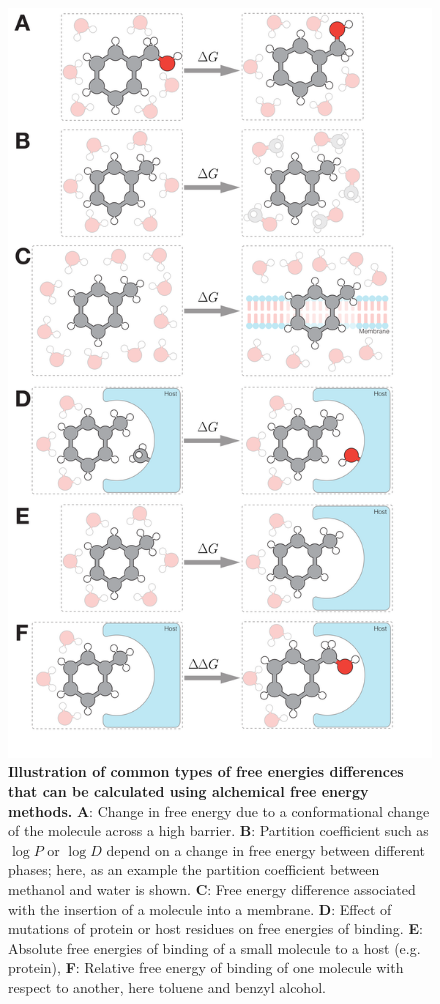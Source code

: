 \documentclass[9pt,bestpractices]{livecoms}
\begin{document}
\begin{figure}
    \includegraphics[width=0.95\linewidth]{figures/fig1_what_is_alchemy/Figure.pdf}   
    \caption{\textbf{Illustration of common types of free energies differences that can be calculated using alchemical free energy methods.} \textbf{A}: Change in free energy due to a conformational change of the molecule across a high barrier. \textbf{B}: Partition coefficient such as $\log P$ or $\log D$ depend on a change in free energy between different phases; here, as an example the partition coefficient between methanol and water is shown. \textbf{C}: Free energy difference associated with the insertion of a molecule into a membrane. \textbf{D}: Effect of mutations of protein or host residues on free energies of binding. \textbf{E}: Absolute free energies of binding of a small molecule to a host (e.g. protein), \textbf{F}: Relative free energy of binding of one molecule with respect to another, here toluene and benzyl alcohol.
    \label{fig:fig_what_is_alchemy}
    }
\end{figure}
\end{document}
